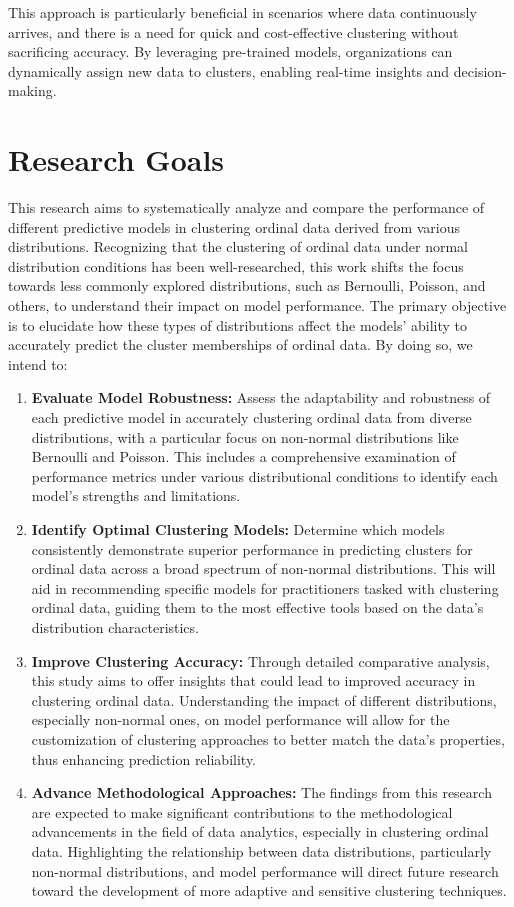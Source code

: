 \documentclass{article}
\begin{document}
This approach is particularly beneficial in scenarios where data continuously arrives, and there is a need for quick and cost-effective clustering without sacrificing accuracy. By leveraging pre-trained models, organizations can dynamically assign new data to clusters, enabling real-time insights and decision-making.

\section{Research Goals}

This research aims to systematically analyze and compare the performance of different predictive models in clustering ordinal data derived from various distributions. Recognizing that the clustering of ordinal data under normal distribution conditions has been well-researched, this work shifts the focus towards less commonly explored distributions, such as Bernoulli, Poisson, and others, to understand their impact on model performance. The primary objective is to elucidate how these types of distributions affect the models' ability to accurately predict the cluster memberships of ordinal data. By doing so, we intend to:

\begin{enumerate}
    \item \textbf{Evaluate Model Robustness:} Assess the adaptability and robustness of each predictive model in accurately clustering ordinal data from diverse distributions, with a particular focus on non-normal distributions like Bernoulli and Poisson. This includes a comprehensive examination of performance metrics under various distributional conditions to identify each model's strengths and limitations.
    \item \textbf{Identify Optimal Clustering Models:} Determine which models consistently demonstrate superior performance in predicting clusters for ordinal data across a broad spectrum of non-normal distributions. This will aid in recommending specific models for practitioners tasked with clustering ordinal data, guiding them to the most effective tools based on the data's distribution characteristics.
    \item \textbf{Improve Clustering Accuracy:} Through detailed comparative analysis, this study aims to offer insights that could lead to improved accuracy in clustering ordinal data. Understanding the impact of different distributions, especially non-normal ones, on model performance will allow for the customization of clustering approaches to better match the data's properties, thus enhancing prediction reliability.
    \item \textbf{Advance Methodological Approaches:} The findings from this research are expected to make significant contributions to the methodological advancements in the field of data analytics, especially in clustering ordinal data. Highlighting the relationship between data distributions, particularly non-normal distributions, and model performance will direct future research toward the development of more adaptive and sensitive clustering techniques.
\end{enumerate}
\end{document}
